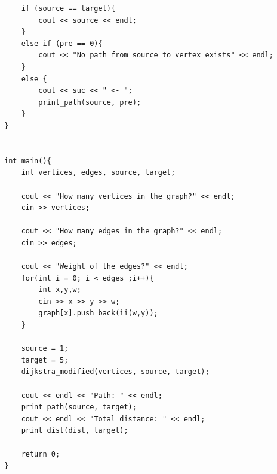 \documentclass[11pt]{article}
\begin{document}
\begin{lstlisting}
	if (source == target){
		cout << source << endl;
	}
	else if (pre == 0){
		cout << "No path from source to vertex exists" << endl;
	}
	else {
		cout << suc << " <- ";
		print_path(source, pre);
	}
}


int main(){
	int vertices, edges, source, target;

	cout << "How many vertices in the graph?" << endl;
	cin >> vertices;
	
	cout << "How many edges in the graph?" << endl;
	cin >> edges;
	
	cout << "Weight of the edges?" << endl;
	for(int i = 0; i < edges ;i++){
		int x,y,w;
		cin >> x >> y >> w;
		graph[x].push_back(ii(w,y));
	}

	source = 1;
	target = 5;
	dijkstra_modified(vertices, source, target);
	
	cout << endl << "Path: " << endl;
	print_path(source, target);
	cout << endl << "Total distance: " << endl;
	print_dist(dist, target);
	
	return 0;
}
\end{lstlisting}
\end{document}
